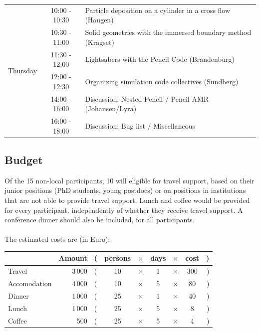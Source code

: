 \documentclass{article}
\begin{document}
\begin{table}
\begin{center}
\begin{tabular}{|l||cl|}
%
\multirow{6}{*}{Thursday} &10:00 - 10:30&Particle deposition on a cylinder in a cross flow (Haugen)\\
                          &10:30 - 11:00&Solid geometries with the immersed boundary method (Kragset)\\
                          &11:30 - 12:00&Lightsabers with the {\sc Pencil Code} (Brandenburg)\\
                          &12:00 - 12:30&Organizing simulation code collectives (Sundberg)\\
                          &14:00 - 16:00&Discussion: Nested Pencil / Pencil AMR (Johansen/Lyra)\\
                          &16:00 - 18:00&Discussion: Bug list / Miscellaneous\\\hline
\end{tabular}
\end{center}
\end{table}

\subsection*{Budget}

Of the 15 non-local participants, 10 will eligible for travel
support, based on their junior positions (PhD students, young
postdocs) or on positions in institutions that are not able to provide
travel support. Lunch and coffee would be provided for every participant,
independently of whether they receive travel support. A conference dinner
should also be included, for all participants.
\\ \\
The estimated costs are (in Euro):
\begin{center}
  \begin{tabular}{|l | r l c c c c c r|}\hline
                & Amount &(& persons &$\times$& days &$\times$& cost &)\\\hline
  Travel        & 3\,000 &(& 10      &$\times$&  1   &$\times$& 300  &)\\
  Accomodation  & 4\,000 &(& 10      &$\times$&  5   &$\times$&  80  &)\\
  Dinner        & 1\,000 &(& 25      &$\times$&  1   &$\times$&  40  &)\\
  Lunch         & 1\,000 &(& 25      &$\times$&  5   &$\times$&   8  &)\\
  Coffee        &    500 &(& 25      &$\times$&  5   &$\times$&   4  &)\\\hline
  \end{tabular}
\end{center}
\end{document}
